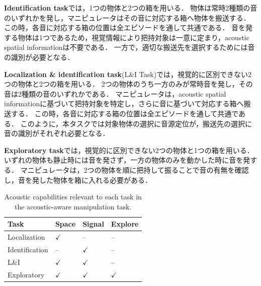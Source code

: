 \documentclass{article}
\begin{document}
\textbf{Identification task}では，1つの物体と2つの箱を用いる．
物体は常時2種類の音のいずれかを発し，マニピュレータはその音に対応する箱へ物体を搬送する．
この時，各音に対応する箱の位置は全エピソードを通して共通である．
音を発する物体は1つであるため，視覚情報により把持対象は一意に定まり，acoustic spatial informationは不要である．
一方で，適切な搬送先を選択するためには音の識別が必要となる．

\textbf{Localization \& identification task}(L\&I Task)では，視覚的に区別できない2つの物体と2つの箱を用いる．
2つの物体のうち一方のみが常時音を発し，その音は2種類の音のいずれかである．
マニピュレータは，acoustic spatial informationに基づいて把持対象を特定し，さらに音に基づいて対応する箱へ搬送する．
この時，各音に対応する箱の位置は全エピソードを通して共通である．
このように，本タスクでは対象物体の選択に音源定位が，搬送先の選択に音の識別がそれぞれ必要となる．

\textbf{Exploratory task}では，視覚的に区別できない2つの物体と1つの箱を用いる．
いずれの物体も静止時には音を発さず，一方の物体のみを動かした時に音を発する．
マニピュレータは，2つの物体を順に把持して振ることで音の有無を確認し，音を発した物体を箱に入れる必要がある．


\begin{table}
  \centering
  \setlength{\tabcolsep}{3pt}
  \caption{
	Acoustic capabilities relevant to each task in the acoustic-aware manipulation task.
	}
  \label{tab:tasks}
  \begin{tabular}{p{} p{}
    >{\centering\arraybackslash}p{}
    >{\centering\arraybackslash}p{}}
    \hline
    Task & Space & Signal & Explore \\
    \hline
    Localization & $\checkmark$ & -- & -- \\
    Identification & -- & $\checkmark$ & -- \\
    L\&I & $\checkmark$ & $\checkmark$ & -- \\
    Exploratory & $\checkmark$ & $\checkmark$ & $\checkmark$ \\
    \hline
  \end{tabular}
\end{table}
\end{document}
